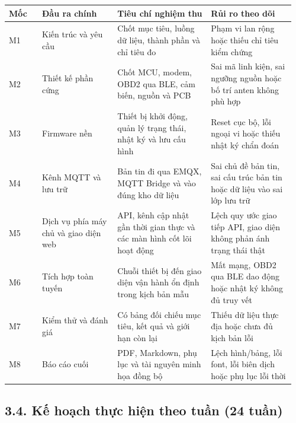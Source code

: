 \documentclass[a4paper]{extarticle}
\newcounter{none} %
\begin{document}
{\def\LTcaptype{none} %
\begin{longtable}{|L{0.110\linewidth}|L{0.255\linewidth}|L{0.315\linewidth}|L{0.280\linewidth}|}
\hline
\textbf{Mốc} & \textbf{Đầu ra chính} & \textbf{Tiêu chí nghiệm thu} & \textbf{Rủi ro theo dõi} \\
\hline
\endhead
\endfoot
\endlastfoot
M1 & Kiến trúc và yêu cầu & Chốt mục tiêu, luồng dữ liệu, thành phần và chỉ tiêu đo & Phạm vi lan rộng hoặc thiếu chỉ tiêu kiểm chứng \\\hline
M2 & Thiết kế phần cứng & Chốt MCU, modem, OBD2 qua BLE, cảm biến, nguồn và PCB & Sai mã linh kiện, sai ngưỡng nguồn hoặc bố trí anten không phù hợp \\\hline
M3 & Firmware nền & Thiết bị khởi động, quản lý trạng thái, nhật ký và lưu cấu hình & Reset cục bộ, lỗi ngoại vi hoặc thiếu nhật ký chẩn đoán \\\hline
M4 & Kênh MQTT và lưu trữ & Bản tin đi qua EMQX, MQTT Bridge và vào đúng kho dữ liệu & Sai chủ đề bản tin, sai cấu trúc bản tin hoặc dữ liệu vào sai lớp lưu trữ \\\hline
M5 & Dịch vụ phía máy chủ và giao diện web & API, kênh cập nhật gần thời gian thực và các màn hình cốt lõi hoạt động & Lệch quy ước giao tiếp API, giao diện không phản ánh trạng thái thật \\\hline
M6 & Tích hợp toàn tuyến & Chuỗi thiết bị đến giao diện vận hành ổn định trong kịch bản mẫu & Mất mạng, OBD2 qua BLE dao động hoặc nhật ký không đủ truy vết \\\hline
M7 & Kiểm thử và đánh giá & Có bảng đối chiếu mục tiêu, kết quả và giới hạn còn lại & Thiếu dữ liệu thực địa hoặc chưa đủ kịch bản lỗi \\\hline
M8 & Báo cáo cuối & PDF, Markdown, phụ lục và tài nguyên minh họa đồng bộ & Lệch hình/bảng, lỗi font, lỗi biên dịch hoặc phụ lục lỗi thời \\\hline
\end{longtable}
}

\subsection{3.4. Kế hoạch thực hiện theo tuần (24 tuần)}\label{app3-weekly-plan-cap-nhat}
\end{document}
